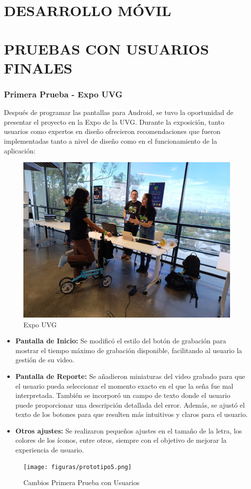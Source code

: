 
\section{DESARROLLO MÓVIL}





\section{PRUEBAS CON USUARIOS FINALES}


\subsubsection{Primera Prueba - Expo UVG}

Después de programar las pantallas para Android, se tuvo la oportunidad de presentar el proyecto en la Expo de la UVG. Durante la exposición, tanto usuarios como expertos en diseño ofrecieron recomendaciones que fueron implementadas tanto a nivel de diseño como en el funcionamiento de la aplicación:


\begin{figure} [H]
    \centering
    \includegraphics[width=0.5\linewidth]{figuras/expo.jpeg}
    \caption{Expo UVG}
    \label{fig:enter-label}
\end{figure}

\begin{itemize}
    \item \textbf{Pantalla de Inicio:} Se modificó el estilo del botón de grabación para mostrar el tiempo máximo de grabación disponible, facilitando al usuario la gestión de su video.
    
    \item \textbf{Pantalla de Reporte:} Se añadieron miniaturas del video grabado para que el usuario pueda seleccionar el momento exacto en el que la seña fue mal interpretada. También se incorporó un campo de texto donde el usuario puede proporcionar una descripción detallada del error. Además, se ajustó el texto de los botones para que resulten más intuitivos y claros para el usuario.
    
    \item \textbf{Otros ajustes:} Se realizaron pequeños ajustes en el tamaño de la letra, los colores de los íconos, entre otros, siempre con el objetivo de mejorar la experiencia de usuario.
\end{itemize}


\begin{figure} [H]
    \centering
    \texttt{[image: figuras/prototipo5.png]}
    \caption{Cambios Primera Prueba con Usuarios}
    \label{fig:enter-label}
\end{figure}


